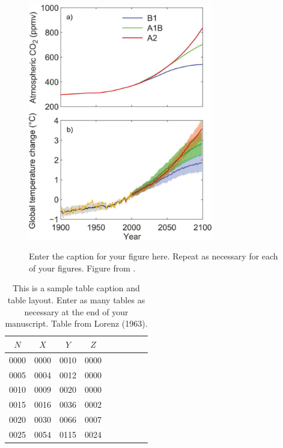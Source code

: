 \documentclass[12pt]{article}
\begin{document}
\begin{figure}[t]
  \noindent\includegraphics[width=19pc,angle=0]{figure01.pdf}\\
  \caption{Enter the caption for your figure here.  Repeat as
  necessary for each of your figures. Figure from \protect\cite{Knutti2008}.}\label{f1}
\end{figure}
\begin{table}[t]
\caption{This is a sample table caption and table layout.  Enter as many tables as
  necessary at the end of your manuscript. Table from Lorenz (1963).}\label{t1}
\begin{center}
\begin{tabular}{ccccrrcrc}
\hline\hline
$N$ & $X$ & $Y$ & $Z$\\
\hline
 0000 & 0000 & 0010 & 0000 \\
 0005 & 0004 & 0012 & 0000 \\
 0010 & 0009 & 0020 & 0000 \\
 0015 & 0016 & 0036 & 0002 \\
 0020 & 0030 & 0066 & 0007 \\
 0025 & 0054 & 0115 & 0024 \\
\hline
\end{tabular}
\end{center}
\end{table}
%
\end{document}
